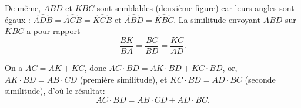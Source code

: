 {\begin{enumerate}
{De même, $ABD$ et $KBC$ sont semblables (deuxième figure) car leurs angles sont égaux : $\widehat{ADB} = \widehat{ACB} = \widehat{KCB}$ et $\widehat{ABD} = \widehat{KBC}$. La similitude envoyant $ABD$ sur $KBC$  a pour rapport \[\frac{BK}{BA}=\frac{BC}{BD} = \frac{KC}{AD}.\]

 


On a $AC = AK + KC$, donc $AC\cdot BD  = AK \cdot BD + KC\cdot BD$, 
or, $AK\cdot BD = AB\cdot CD$ (première similitude), et $KC \cdot BD = AD\cdot BC$ (seconde similitude), d'où le résultat:
\[ AC\cdot BD = AB\cdot CD + AD\cdot BC.\]
}
\end{enumerate}
}

